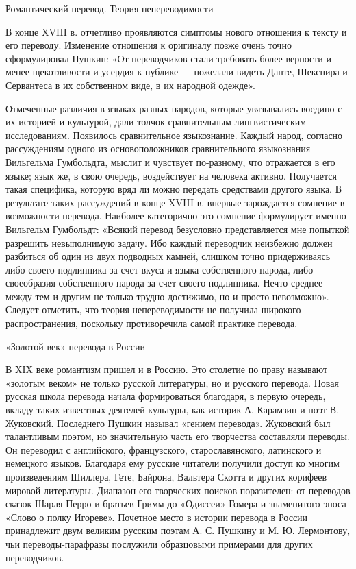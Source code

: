 Романтический перевод. Теория непереводимости

В конце XVIII в. отчетливо проявляются симптомы нового отношения к тексту и его переводу. Изменение отношения к оригиналу позже очень точно сформулировал Пушкин: «От переводчиков стали требовать более верности и менее щекотливости и усердия к публике --- пожелали видеть Данте, Шекспира и Сервантеса в их собственном виде, в их народной одежде». 

Отмеченные различия в языках разных народов, которые увязывались воедино с их историей и культурой, дали толчок сравнительным лингвистическим исследованиям. Появилось сравнительное языкознание. Каждый народ, согласно рассуждениям одного из основоположников сравнительного языкознания Вильгельма Гумбольдта, мыслит и чувствует по-разному, что отражается в его языке; язык же, в свою очередь, воздействует на человека активно. Получается такая специфика, которую вряд ли можно передать средствами другого языка. В результате таких рассуждений в конце XVIII в. впервые зарождается сомнение в возможности перевода. Наиболее категорично это сомнение формулирует именно Вильгельм Гумбольдт: «Всякий перевод безусловно представляется мне попыткой разрешить невыполнимую задачу. Ибо каждый переводчик неизбежно должен разбиться об один из двух подводных камней, слишком точно придерживаясь либо своего подлинника за счет вкуса и языка собственного народа, либо своеобразия собственного народа за счет своего подлинника. Нечто среднее между тем и другим не только трудно достижимо, но и просто невозможно». Следует отметить, что теория непереводимости не получила широкого распространения, поскольку противоречила самой практике перевода.

«Золотой век» перевода в России

В XIX веке романтизм пришел и в Россию. Это столетие по праву называют «золотым веком» не только русской литературы, но и русского перевода. Новая русская школа перевода начала формироваться благодаря, в первую очередь, вкладу таких известных деятелей культуры, как историк А. Карамзин и поэт В. Жуковский. Последнего Пушкин называл «гением перевода».  Жуковский был талантливым поэтом, но значительную часть его творчества составляли переводы. Он переводил с английского, французского, старославянского, латинского и немецкого языков. Благодаря ему русские читатели получили доступ ко многим произведениям Шиллера, Гете, Байрона, Вальтера Скотта и других корифеев мировой литературы. Диапазон его творческих поисков поразителен: от переводов сказок Шарля Перро и братьев Гримм до «Одиссеи» Гомера и знаменитого эпоса «Слово о полку Игореве». Почетное место в истории перевода в России принадлежит двум великим русским поэтам А. С. Пушкину и М. Ю. Лермонтову, чьи переводы-парафразы послужили образцовыми примерами для других переводчиков.